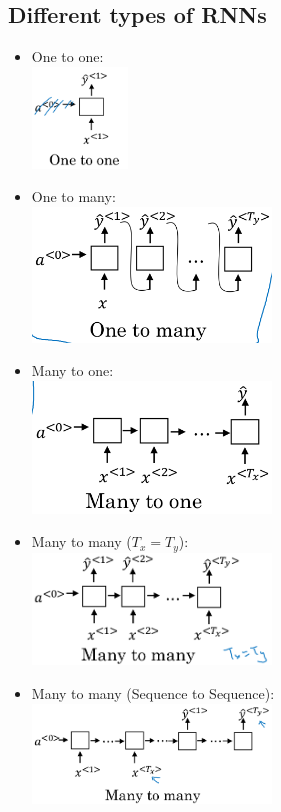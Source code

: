 \documentclass[12pt,a4paper]{report}
\begin{document}
		\subsection{Different types of RNNs}
			\begin{itemize}
				\item One to one:\\\includegraphics[width=0.2\textwidth]{1to1}
				\item One to many:\\\includegraphics[width=0.5\textwidth]{1toMany}
				\item Many to one:\\\includegraphics[width=0.5\textwidth]{ManyTo1}
				\item Many to many ($T_x=T_y$):\\\includegraphics[width=0.5\textwidth]{ManyToMany1}
				\item Many to many (Sequence to Sequence):\\\includegraphics[width=0.5\textwidth]{ManyToMany2}
			\end{itemize}
\end{document}
